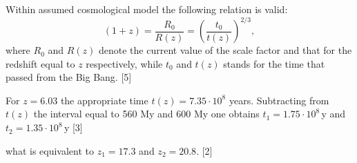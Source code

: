 Within assumed cosmological model the following relation is valid:
\[
(1+z) = \frac{R_0}{R(z)} = \left(\frac{t_0}{t(z)}\right)^{2/3},
\]
where $R_0$ and $R(z)$ denote the current value of the scale factor and that
for the redshift equal to $z$ respectively, while $t_0$ and $t(z)$ stands for
the time that passed from the Big Bang. \hfill[5]

For $z=6.03$ the appropriate time $t(z) = 7.35\cdot10^{8}$ years. Subtracting
from $t(z)$ the interval equal to 560 My and 600 My one obtains
$t_1 = 1.75\cdot10^{8}$\,y and $t_2 = 1.35\cdot10^{8}$\,y \hfill[3]

what is equivalent to $z_1 = 17.3$ and $z_2 = 20.8$. \hfill[2]

